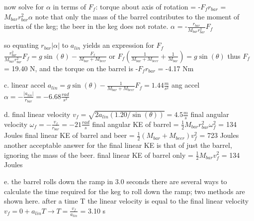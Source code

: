now solve for $\alpha$ in terms of $F_{f}$:\newline
torque about axis of rotation = -$F_{f}r_{bar}$ = $M_{bar}r_{bar}^{2} \alpha$\newline
note that only the mass of the barrel contributes to the moment of inertia of the\newline
keg; the beer in the keg does not rotate.\newline
$\alpha$ = -$\frac{r_{bar}}{M_{bar}r_{bar}^{2}} F_{f}$\newline

so equating $r_{bar} |\alpha|$ to $a_{lin}$ yields an expression for $F_{f}$\newline
$\frac{r_{bar}^{2}}{M_{bar}r_{bar}^{2}} F_{f} = g\sin(\theta) - \frac{F_{f}}{M_{bar} + M_{beer}}$\newline
or $F_{f}(\frac{1}{M_{bar} + M_{beer}} + \frac{1}{M_{bar}}) = g\sin(\theta)$\newline
thus $F_{f}$ = 19.40 N, and the torque on the barrel is -$F_{f}r_{bar}$ = -4.17 Nm\newline

c. \newline
linear accel $a_{lin} = g\sin(\theta) - \frac{1}{M_{bar} + M_{beer}}F_{f} = 1.44 \frac{m}{s^{2}}$\newline
ang accel $\alpha = -\frac{|a_{lin}|}{r_{bar}} = -6.68 \frac{rad}{s^{2}}$\newline

d. \newline
final linear velocity $v_{f} = \sqrt{2a_{lin}(1.20 / \sin(\theta) )} = 4.5 \frac{m}{s}$\newline
final angular velocity $\omega_{f} = -\frac{v_{f}}{r_{bar}} = -21 \frac{rad}{s}$\newline
final angular KE of barrel = $\frac{1}{2}M_{bar}r_{bar}^{2} \omega_{f}^{2}$ = 134 Joules\newline
final linear KE of barrel and beer = $\frac{1}{2}(M_{bar} + M_{beer}) v_{f}^{2}$ = 723 Joules\newline
another acceptable answer for the final linear KE is that of just the barrel, ignoring\newline
the mass of the beer.\newline
final linear KE of barrel only = $\frac{1}{2}M_{bar} v_{f}^{2}$ = 134 Joules\newline

e. the barrel rolls down the ramp in 3.0 seconds\newline
there are several ways to calculate the time required for the keg to roll down\newline
the ramp; two methods are shown here.\newline
after a time T the linear velocity is equal to the final linear velocity\newline
$v_{f} = 0 + a_{lin}T \rightarrow T = \frac{v_{f}}{a_{lin}}$ = 3.10 s\newline

